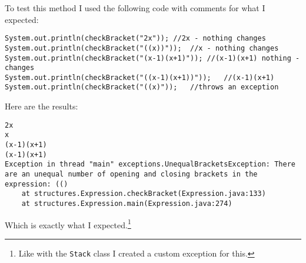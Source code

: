 \documentclass[../../../../main.tex]{subfiles}
\begin{document}
\newpage\noindent
To test this method I used the following code with comments for what I expected:
\begin{verbatim}
System.out.println(checkBracket("2x"));	//2x - nothing changes
System.out.println(checkBracket("((x))"));	//x - nothing changes
System.out.println(checkBracket("(x-1)(x+1)"));	//(x-1)(x+1) nothing - changes
System.out.println(checkBracket("((x-1)(x+1))"));	//(x-1)(x+1)
System.out.println(checkBracket("((x)"));	//throws an exception
\end{verbatim}
Here are the results:
\begin{verbatim}
2x
x
(x-1)(x+1)
(x-1)(x+1)
Exception in thread "main" exceptions.UnequalBracketsException: There are an unequal number of opening and closing brackets in the expression: (()
	at structures.Expression.checkBracket(Expression.java:133)
	at structures.Expression.main(Expression.java:274)
\end{verbatim}
Which is exactly what I expected.\footnote{Like with the \texttt{Stack} class I  created a custom exception for this.}
\newpage
\end{document}
